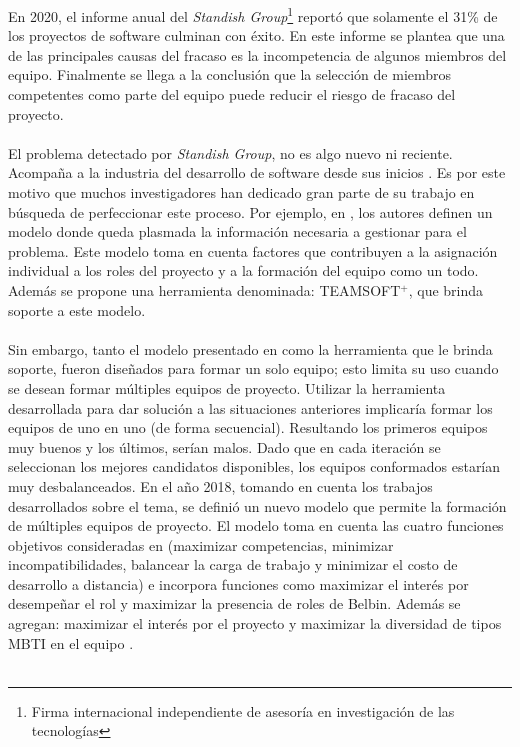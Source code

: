En 2020, el informe anual del \textit{Standish Group}\footnote{Firma internacional independiente de asesoría en investigación de las tecnologías}\cite{Group2020} reportó que solamente el 31\% de los proyectos de software culminan con éxito. En este informe se plantea que una de las principales causas del fracaso es la incompetencia de algunos miembros del equipo. Finalmente se llega a la conclusión que la selección de miembros competentes como parte del equipo puede reducir el riesgo de fracaso del proyecto.\\ \\

El problema detectado por \textit{Standish Group}, no es algo nuevo ni reciente. Acompaña a la industria del desarrollo de software desde sus inicios \cite{ElEmam2008}. Es por este motivo que muchos investigadores han dedicado gran parte de su trabajo en búsqueda de perfeccionar este proceso. Por ejemplo, en \cite{Mayi09}, los autores definen un modelo donde queda plasmada la información necesaria a gestionar para el problema. Este modelo toma en cuenta factores que contribuyen a la asignación individual a los roles del proyecto y a la formación del equipo como un todo. Además se propone una herramienta denominada: TEAMSOFT$^+$, que brinda soporte a este modelo.\\\\

Sin embargo, tanto el modelo presentado en \cite{Mayi09} como la herramienta que le brinda soporte, fueron diseñados para formar un solo equipo; esto limita su uso cuando se desean formar múltiples equipos de proyecto. Utilizar la herramienta desarrollada para dar solución a las situaciones anteriores implicaría formar los equipos de uno en uno (de forma secuencial). Resultando los primeros equipos muy buenos y los últimos, serían malos. Dado que en cada iteración se seleccionan los mejores candidatos disponibles, los equipos conformados estarían muy  desbalanceados. En el año 2018, tomando en cuenta los trabajos desarrollados sobre el tema, se definió un nuevo modelo que permite la formación de múltiples equipos de proyecto. El modelo toma en cuenta las cuatro funciones objetivos consideradas en \cite{Mayi09} (maximizar competencias, minimizar incompatibilidades, balancear la carga de trabajo y minimizar el costo de desarrollo a distancia) e incorpora funciones como maximizar el interés por desempeñar el rol y maximizar la presencia de roles de Belbin. Además se agregan: maximizar el interés por el proyecto y maximizar la diversidad de tipos MBTI en el equipo \cite{Duran2019}.\\\\


